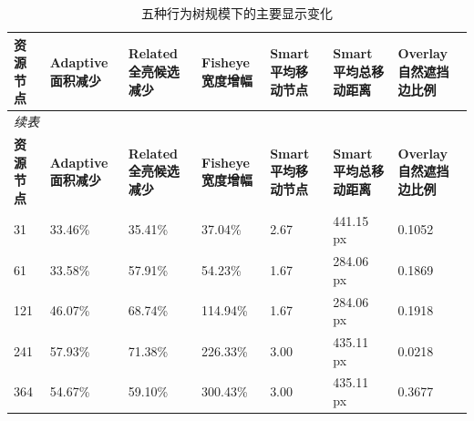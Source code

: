 \documentclass[11pt,a4paper,oneside,extrafontsizes]{memoir}
\begin{document}
\begin{center}

\begin{longtable}{@{}p{} p{} p{} p{} p{} p{} p{}@{}}
\caption{五种行为树规模下的主要显示变化}\label{tab:tree-size-results}\\
\toprule
\textbf{资源节点} & \textbf{Adaptive 面积减少} & \textbf{Related 全亮候选减少} & \textbf{Fisheye 宽度增幅} & \textbf{Smart 平均移动节点} & \textbf{Smart 平均总移动距离} & \textbf{Overlay 自然遮挡边比例} \\
\midrule
\endfirsthead
\multicolumn{7}{l}{\itshape 续表}\\
\toprule
\textbf{资源节点} & \textbf{Adaptive 面积减少} & \textbf{Related 全亮候选减少} & \textbf{Fisheye 宽度增幅} & \textbf{Smart 平均移动节点} & \textbf{Smart 平均总移动距离} & \textbf{Overlay 自然遮挡边比例} \\
\midrule
\endhead
31 & 33.46\% & 35.41\% & 37.04\% & 2.67 & 441.15 px & 0.1052 \\
61 & 33.58\% & 57.91\% & 54.23\% & 1.67 & 284.06 px & 0.1869 \\
121 & 46.07\% & 68.74\% & 114.94\% & 1.67 & 284.06 px & 0.1918 \\
241 & 57.93\% & 71.38\% & 226.33\% & 3.00 & 435.11 px & 0.0218 \\
364 & 54.67\% & 59.10\% & 300.43\% & 3.00 & 435.11 px & 0.3677 \\
\bottomrule
\end{longtable}


\end{center}
\end{document}
